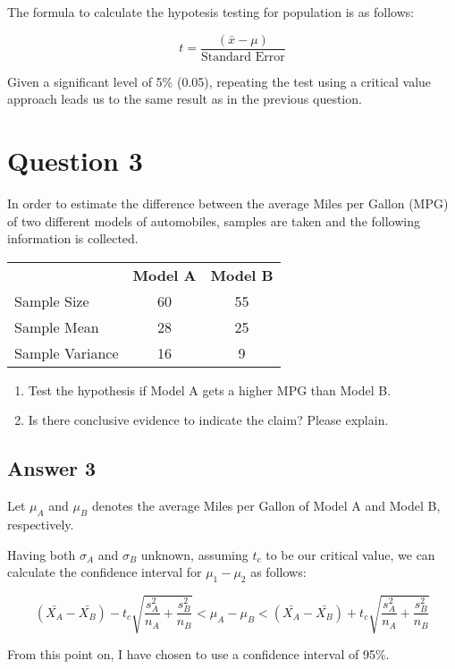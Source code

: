 \documentclass[
	11pt, %
]{assignment}
\begin{document}
The formula to calculate the hypotesis testing for population is as follows:

\[
	t = \frac{(\bar{x} - \mu)}{\text{Standard Error}}
\]

Given a significant level of 5\% (0.05), repeating the test using a critical value approach leads us to the same result as in the previous question.

\section*{Question 3}
\begin{problem}
In order to estimate the difference between the average Miles per Gallon (MPG) of two different models of automobiles, samples are taken and the following information is collected.

\begin{tabular}{l c c}
	                & \textbf{Model A} & \textbf{Model B} \\
	Sample Size     & 60               & 55               \\
	Sample Mean     & 28               & 25               \\
	Sample Variance & 16               & 9
\end{tabular}
\medskip
\begin{enumerate}
	\item Test the hypothesis if Model A gets a higher MPG than Model B.
	\item Is there conclusive evidence to indicate the claim? Please explain.
\end{enumerate}
\end{problem}

\subsection*{Answer 3}

Let \(\mu_A\) and \(\mu_B\) denotes the average Miles per Gallon of Model A and Model B, respectively.

Having both \(\sigma_A\) and \(\sigma_B\) unknown, assuming \(t_c\) to be our critical value, we can calculate the confidence interval for \(\mu_1 - \mu_2\) as follows:

\[
	(\bar{X_A} - \bar{X_B}) - t_c \sqrt{\frac{s_A^2}{n_A} + \frac{s_B^2}{n_B}} < \mu_A - \mu_B < (\bar{X_A} - \bar{X_B}) + t_c \sqrt{\frac{s_A^2}{n_A} + \frac{s_B^2}{n_B}}
\]

From this point on, I have chosen to use a confidence interval of 95\%.
\end{document}
